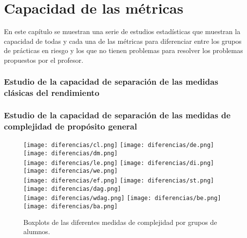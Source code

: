 \chapter{Capacidad de las métricas}\label{sec:diferencias}

En este capítulo se muestran una serie de estudios estadísticas que muestran la capacidad de todas y cada una de las métricas para diferenciar entre los grupos de prácticas en riesgo y los que no tienen problemas para resolver los problemas propuestos por el profesor.

\subsection{Estudio de la capacidad de separación de las medidas clásicas del rendimiento}

\subsection{Estudio de la capacidad de separación de las medidas de complejidad de propósito general}

\begin{figure}[H]
\centering
\texttt{[image: diferencias/cl.png]}
\texttt{[image: diferencias/de.png]}
\texttt{[image: diferencias/dm.png]} \\
\texttt{[image: diferencias/le.png]}
\texttt{[image: diferencias/di.png]}
\texttt{[image: diferencias/we.png]} \\
\texttt{[image: diferencias/ef.png]}
\texttt{[image: diferencias/st.png]}
\texttt{[image: diferencias/dag.png]} \\
\texttt{[image: diferencias/wdag.png]}
\texttt{[image: diferencias/be.png]}
\texttt{[image: diferencias/ba.png]}
\caption{Boxplots de las diferentes medidas de complejidad por grupos de alumnos.}
\label{fig:tstudentcomplexity}
\end{figure}

